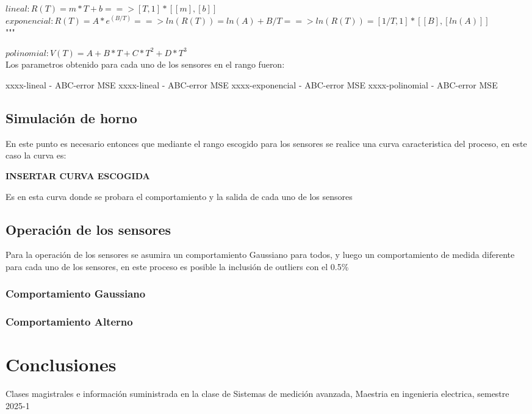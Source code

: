 \documentclass[conference]{IEEEtran}
\begin{document}
$lineal: R(T) = m*T + b ==> [T, 1] * [[m], [b]]$\\

$exponencial: R(T) = A * e^(B/T) ==> ln(R(T)) = ln(A) + B/T ==> ln(R(T)) = [1/T, 1] * [[B], [ln(A)]]$\\
"""

$polinomial: V(T) = A + B * T + C * T^2 + D * T^3$\\

Los parametros obtenido para cada uno de los sensores en el rango fueron:

xxxx-lineal - ABC-error MSE
xxxx-lineal - ABC-error MSE
xxxx-exponencial - ABC-error MSE
xxxx-polinomial - ABC-error MSE

\subsection{Simulación de horno}

En este punto es necesario entonces que mediante el rango escogido para los sensores se realice una curva caracteristica del proceso, en este caso la curva es:

\textbf{INSERTAR CURVA ESCOGIDA}

Es en esta curva donde se probara el comportamiento y la salida de cada uno de los sensores

\subsection{Operación de los sensores}

Para la operación de los sensores se asumira un comportamiento Gaussiano para todos, y luego un comportamiento de medida diferente para cada uno de los sensores, en este proceso es posible la inclusión de outliers con el 0.5\%

\subsubsection{Comportamiento Gaussiano}

\subsubsection{Comportamiento Alterno}


\section{Conclusiones}


\begin{thebibliography}{00}

\item Clases magistrales e información suministrada en la clase de Sistemas de medición avanzada, Maestria en ingenieria electrica, semestre 2025-1

\end{thebibliography}
\end{document}
